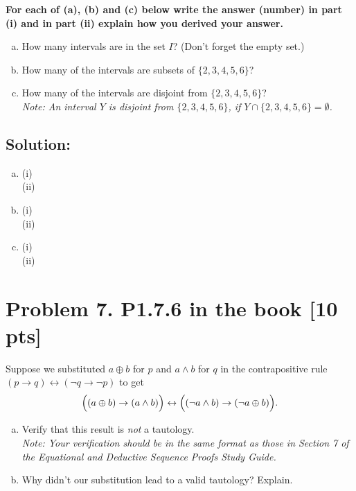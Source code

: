 \documentclass[12pt]{article}
\begin{document}
\bigskip

{\bf For each of (a), (b) and (c) below write the answer (number) in part (i) and in part (ii)  explain how you derived your answer.}

\begin{enumerate} [(a)]
    \item How many intervals are in the set $I$? (Don’t forget the empty set.) 
    \item How many of the intervals are subsets of $\{2, 3, 4, 5, 6\}$?
    \item How many of the intervals are disjoint from $\{2, 3, 4, 5, 6\}$?\\
    {\em \small 
    Note: An interval $Y$ is {\em disjoint} from $\{2, 3, 4, 5, 6\}$, if 
    $Y \cap \{2, 3, 4, 5, 6\}= \emptyset$.
    }
\end{enumerate}

\bigskip

\subsection*{\textbf{Solution:}}
\begin{enumerate}[(a)]
\item (i)\\
(ii)

\item (i)\\
(ii)

\item (i)\\
(ii)
\end{enumerate}



\newpage
\section*{\textbf{Problem 7. P1.7.6 in the book} [10 pts]}
Suppose we substituted $a \oplus b$ for $p$ and $a \land b$ for $q$ in the contrapositive rule 
$(p \rightarrow q) \leftrightarrow (\neg q \rightarrow \neg p)$ to get 
$$\Bigl((a \oplus b) \rightarrow (a \land b)\Bigr) \leftrightarrow \Bigl((\neg a \land b) \rightarrow (\neg a \oplus b)\Bigr).$$ 

\begin{enumerate}[(a)]
    \item 
 Verify that this result is \textit{not} a tautology.\\
{\em \small Note:  Your verification should be in the same format as those in Section 7  of the  Equational and Deductive Sequence Proofs Study Guide.}

\item  Why didn’t our substitution lead to a valid tautology? Explain.
\end{enumerate}
\end{document}
